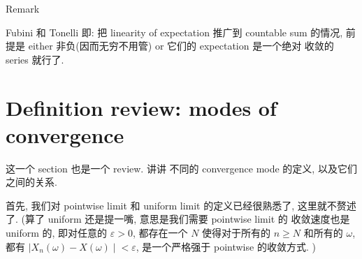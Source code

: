 \begin{qlremark}{Remark}

Fubini 和 Tonelli 即: 把 linearity of expectation 推广到 countable sum 的情况, 前提是 either 非负(因而无穷不用管) or 它们的 expectation 是一个绝对 收敛的 series 就行了.

\end{qlremark}

\section{Definition review: modes of convergence}\label{definition-review-modes-of-convergence}

这一个 section 也是一个 review. 讲讲 不同的 convergence mode 的定义, 以及它们之间的关系.

首先, 我们对 pointwise limit 和 uniform limit 的定义已经很熟悉了, 这里就不赘述了. (算了 uniform 还是提一嘴, 意思是我们需要 pointwise limit 的 收敛速度也是 uniform 的, 即对任意的 \(\mathit{\varepsilon} > 0\), 都存在一个 \(\mathit{N}\) 使得对于所有的 \(\mathit{n} \geq \mathit{N}\) 和所有的 \(\mathit{\omega}\), 都有 \(\left. |\mathit{X}_{\mathit{n}}(\mathit{\omega}) - \mathit{X}(\mathit{\omega}) \middle| < \mathit{\varepsilon} \right.\), 是一个严格强于 pointwise 的收敛方式. )

